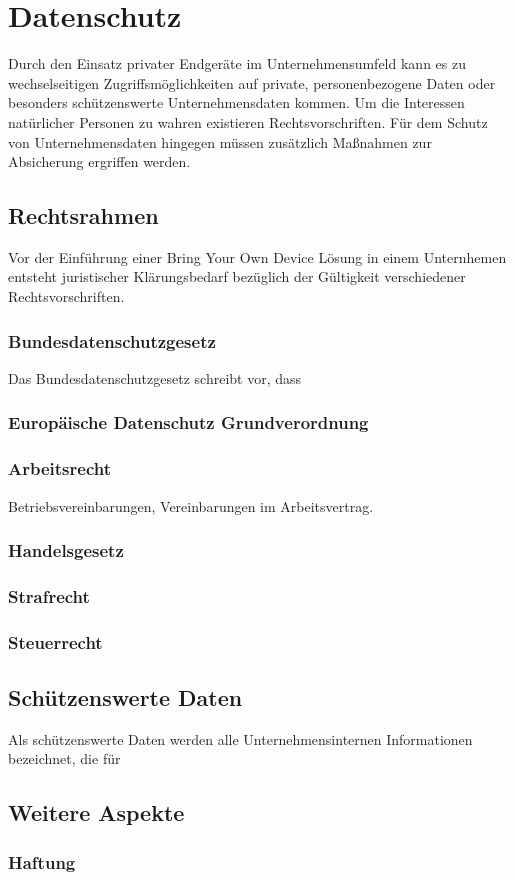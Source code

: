 \chapter{Datenschutz}
Durch den Einsatz privater Endgeräte im Unternehmensumfeld kann es zu wechselseitigen Zugriffsmöglichkeiten auf private, personenbezogene Daten oder besonders schützenswerte Unternehmensdaten kommen. 
Um die Interessen natürlicher Personen zu wahren existieren Rechtsvorschriften. Für dem Schutz von Unternehmensdaten hingegen müssen zusätzlich Maßnahmen zur Absicherung ergriffen werden.


\section {Rechtsrahmen}
Vor der Einführung einer Bring Your Own Device Lösung in einem Unternhemen entsteht juristischer Klärungsbedarf bezüglich der Gültigkeit verschiedener Rechtsvorschriften. 
\subsection{Bundesdatenschutzgesetz}
Das Bundesdatenschutzgesetz schreibt vor, dass 

\subsection{Europäische Datenschutz Grundverordnung}
\subsection{Arbeitsrecht}
Betriebsvereinbarungen, Vereinbarungen im Arbeitsvertrag. 
\subsection{Handelsgesetz}
\subsection{Strafrecht}
\subsection{Steuerrecht}
\section {Schützenswerte Daten}

Als schützenswerte Daten werden alle Unternehmensinternen Informationen bezeichnet, die für 



\section {Weitere Aspekte}

\subsection{Haftung}













